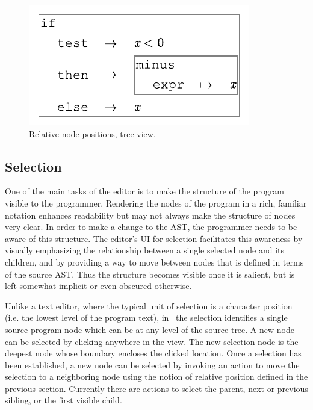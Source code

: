 \begin{figure}
  
  \includegraphics{src/image/position-gen.pdf}
  \caption{Relative node positions, tree view.}
  \label{fig-position-tree}
\end{figure}

\subsection{Selection}
One of the main tasks of the editor is to make the structure of the program visible to the programmer. Rendering the nodes of the program in a rich, familiar notation enhances readability but may not always make the structure of nodes very clear. In order to make a change to the AST, the programmer needs to be aware of this structure. The editor's UI for selection facilitates this awareness by visually emphasizing the relationship between a single selected node and its children, and by providing a way to move between nodes that is defined in terms of the source AST. Thus the structure becomes visible once it is salient, but is left somewhat implicit or even obscured otherwise.

Unlike a text editor, where the typical unit of selection is a character position (i.e. the lowest level of the program text), in \Meta\ the selection identifies a single source-program node which can be at any level of the source tree. A new node can be selected by clicking anywhere in the view. The new selection node is the deepest node whose boundary encloses the clicked location. Once a selection has been established, a new node can be selected by invoking an action to move the selection to a neighboring node using the notion of relative position defined in the previous section. Currently there are actions to select the parent, next or previous sibling, or the first visible child.


